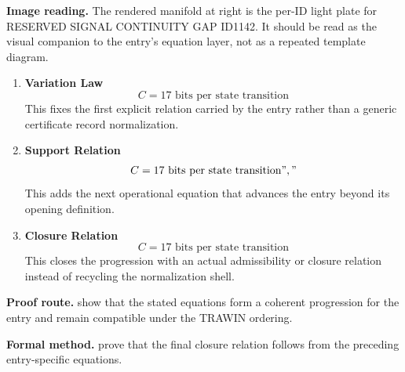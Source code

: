 \begin{samepage}
\noindent\begin{minipage}[t]{0.45\linewidth}
\vspace{0pt}
\raggedright
\scriptsize\textbf{Image reading.} The rendered manifold at right is the per-ID light plate for RESERVED SIGNAL CONTINUITY GAP ID1142. It should be read as the visual companion to the entry's equation layer, not as a repeated template diagram.\par
\end{minipage}\hfill
\begin{minipage}[t]{0.53\linewidth}
\vspace*{-0.10in}
\raggedright
{}
\end{minipage}
\end{samepage}

\clearpage


\begin{enumerate}[leftmargin=1.6em,itemsep=9pt,topsep=6pt]
\item \textbf{Variation Law}
\[
C = 17 \text{ bits per state transition}
\]
This fixes the first explicit relation carried by the entry rather than a generic certificate record normalization.

\item \textbf{Support Relation}
\[
C = 17 \text{ bits per state transition}","
\]
This adds the next operational equation that advances the entry beyond its opening definition.

\item \textbf{Closure Relation}
\[
C = 17 \text{ bits per state transition}
\]
This closes the progression with an actual admissibility or closure relation instead of recycling the normalization shell.
\end{enumerate}

\textbf{Proof route.} show that the stated equations form a coherent progression for the entry and remain compatible under the TRAWIN ordering.

\textbf{Formal method.} prove that the final closure relation follows from the preceding entry-specific equations.

\medskip
{}

